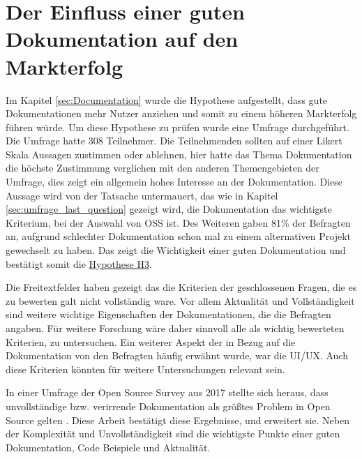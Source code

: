 \section{Der Einfluss einer guten Dokumentation auf den Markterfolg}


Im Kapitel \ref{sec:Documentation} wurde die Hypothese aufgestellt, dass gute Dokumentationen mehr
Nutzer anziehen und somit zu einem höheren Markterfolg führen würde.
Um diese Hypothese zu prüfen wurde eine Umfrage durchgeführt. Die Umfrage hatte 308 Teilnehmer.
Die Teilnehmenden sollten auf einer Likert Skala Aussagen zustimmen oder ablehnen, hier hatte das
Thema Dokumentation die höchste Zustimmung verglichen mit den anderen Themengebieten der Umfrage,
dies zeigt ein allgemein hohes Interesse an der Dokumentation. Diese Aussage wird von der Tatsache
untermauert, das wie in Kapitel \ref{sec:umfrage_last_question} gezeigt wird, die Dokumentation
das wichtigste Kriterium, bei der Auswahl von OSS ist. Des Weiteren gaben 81\% der Befragten an,
aufgrund schlechter Dokumentation schon mal zu einem alternativen Projekt gewechselt zu haben.
Das zeigt die Wichtigkeit einer guten Dokumentation und bestätigt somit die
\hyperref[H:3]{Hypothese H3}.


Die Freitextfelder haben gezeigt das die Kriterien der geschlossenen Fragen, die es zu bewerten 
galt nicht vollständig ware. Vor allem Aktualität und Vollständigkeit sind weitere wichtige 
Eigenschaften der Dokumentationen, die die Befragten angaben.
Für weitere Forschung wäre daher sinnvoll alle als wichtig bewerteten Kriterien, zu untersuchen.
Ein weiterer Aspekt der in Bezug auf die Dokumentation von den Befragten häufig erwähnt wurde,
war die UI/UX. Auch diese Kriterien könnten für weitere Untersuchungen relevant sein.

In einer Umfrage der Open Source Survey aus 2017 stellte sich heraus, dass unvollständige bzw.
verirrende Dokumentation als größtes Problem in Open Source gelten \cite{GitHubOpenSourceSurvey2017}.
Diese Arbeit bestätigt diese Ergebnisse, und erweitert sie. Neben der Komplexität und Unvollständigkeit
sind die wichtigste Punkte einer guten Dokumentation, Code Beispiele und Aktualität.




